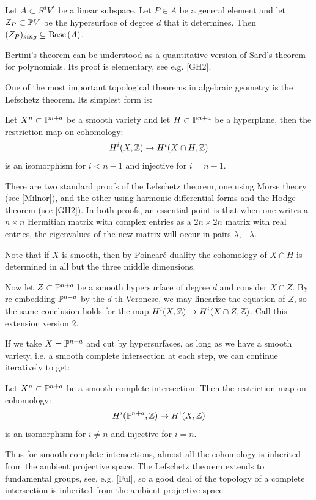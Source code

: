  Let $A\subset S^dV^*$
be a linear subspace. Let $P\in A$
be a general element and let $Z_P\subset\Bbb P V$ be the hypersurface
of degree $d$ that
it determines. Then $(Z_P)_{sing}\subseteq\text{Base}\, (A)$.
\endproclaim

Bertini's theorem can be understood as a quantitative version
of Sard's theorem for polynomials. Its proof is elementary,
see e.g. [GH2].


One of the most important topological theorems in algebraic geometry
is the Lefschetz theorem. Its simplest form is:

Let $X^n\subset\Bbb P^{n+a}$ be
a smooth variety and let $H\subset\Bbb P^{n+a}$
be a hyperplane, then the restriction map on cohomology:
$$
H^i(X,\Bbb Z)\rightarrow H^i(X\cap H, \Bbb Z)
$$
is an isomorphism for $i<n-1$ and injective for $i=n-1$.
\endproclaim

There are two standard proofs of the Lefschetz theorem, one using
Morse theory (see [Milnor]), and the other using harmonic differential
forms
and the Hodge theorem (see [GH2]). In both proofs, an essential point
is that when one writes a $n\times n$ 
Hermitian matrix with complex
entries as a $2n\times 2n$ matrix with real entries, the
eigenvalues of the new
matrix will occur in pairs $\lambda, -\lambda$.
 
 
Note that if $X$ is smooth, then by Poincar\'e duality  the cohomology
of $X\cap H$ is determined
 in all but the three middle dimensions.

Now let $Z\subset\Bbb P^{n+a}$ be a smooth  hypersurface of degree $d$
and consider
$X\cap Z$. By re-embedding $\Bbb P^{n+a}$ by the $d$-th Veronese, we may
linearize
the equation of $Z$, so the same conclusion holds for the map 
$
H^i(X,\Bbb Z)\rightarrow H^i(X\cap Z, \Bbb Z)
$.
Call this extension version 2.

If we take $X=\Bbb P^{n+a}$ and cut by hypersurfaces, as long as we have a
smooth variety, i.e. a smooth complete intersection at each step,
we can continue iteratively to get:

Let $X^n\subset\Bbb P^{n+a}$ be
a smooth complete intersection.  Then the restriction map on cohomology:
$$
H^i(\Bbb P^{n+a} ,\Bbb Z)\rightarrow H^i(X, \Bbb Z)
$$
is an isomorphism for  $i\neq n$  and injective for $i=n$.
\endproclaim

Thus for smooth complete intersections, almost all the cohomology
 is inherited from the ambient
projective space. The Lefschetz theorem  extends
to fundamental groups,
see, e.g. [Ful], so   a good deal of the topology
of a complete intersection
is inherited from the ambient projective space.

